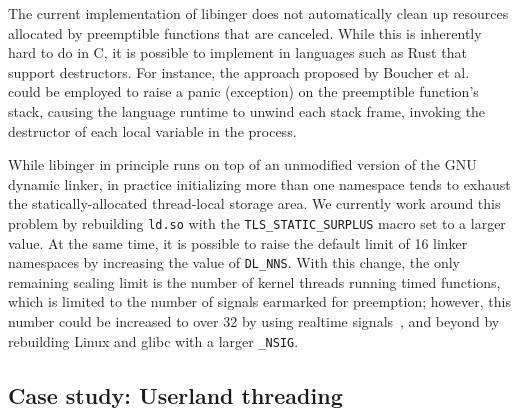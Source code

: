 The current implementation of libinger does not automatically clean up resources
allocated by preemptible functions that are canceled.  While this is inherently hard
to do in C, it is possible to implement in languages such as Rust that support
destructors.  For instance, the approach proposed by Boucher et
al.~\cite{boucher:atc2018} could be employed to raise a panic (exception) on the
preemptible function's stack, causing the language runtime to unwind each stack frame,
invoking the destructor of each local variable in the process.

While libinger in principle runs on top of an unmodified version of the GNU dynamic
linker, in practice initializing more than one namespace tends to exhaust the
statically-allocated thread-local storage area.  We currently work around this
problem by rebuilding \texttt{ld.so} with the \texttt{TLS\_STATIC\_SURPLUS} macro set
to a larger value.  At the same time, it is possible to raise the default limit
of 16 linker namespaces by increasing the value of \texttt{DL\_NNS}.  With this
change, the only remaining scaling limit is the number of kernel threads running
timed functions, which is limited to the number of signals earmarked for preemption;
however, this number could be increased to over 32 by using realtime
signals~\cite{signal-manpage}, and beyond by rebuilding Linux and glibc with a larger
\texttt{\_NSIG}.



\subsection{Case study: Userland threading}
\label{sec:threading}
